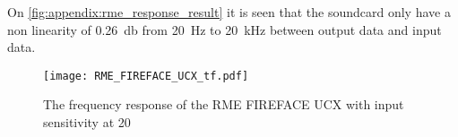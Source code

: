 On \autoref{fig:appendix:rme_response_result} it is seen that the soundcard only have a non linearity of \SI{0.26}{\decibel} from \SI{20}{\hertz} to \SI{20}{\kilo\hertz} between output data and input data. 

\begin{figure}[H]
	\centering
	\texttt{[image: RME\_FIREFACE\_UCX\_tf.pdf]}
	\caption{The frequency response of the RME FIREFACE UCX with input sensitivity at 20}
		\label{fig:appendix:rme_response_result}
\end{figure}

